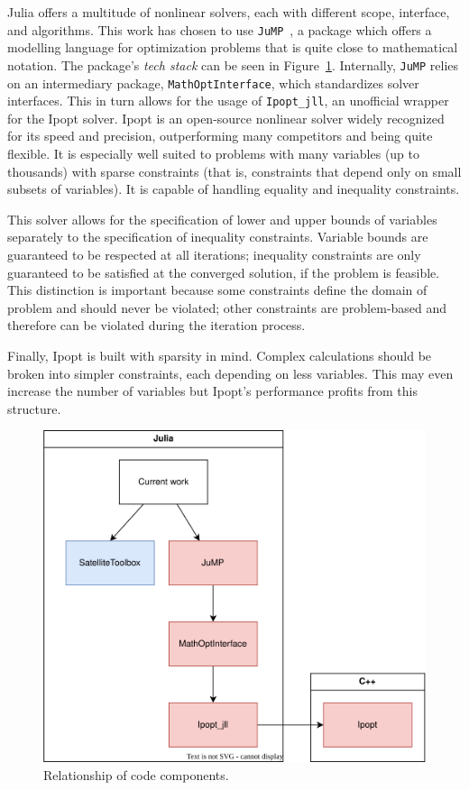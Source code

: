 Julia offers a multitude of nonlinear solvers, each with different scope, interface, and algorithms. This work has chosen to use \texttt{JuMP}~\cite{jump}, a package which offers a modelling language for optimization problems that is quite close to mathematical notation. The package's \textit{tech stack} can be seen in Figure~\ref{fig:tech_stack}. Internally, \texttt{JuMP} relies on an intermediary package, \texttt{MathOptInterface}, which standardizes solver interfaces. This in turn allows for the usage of \texttt{Ipopt\_jll}, an unofficial wrapper for the Ipopt solver. Ipopt is an open-source nonlinear solver widely recognized for its speed and precision, outperforming many competitors and being quite flexible. It is especially well suited to problems with many variables (up to thousands) with sparse constraints (that is, constraints that depend only on small subsets of variables). It is capable of handling equality and inequality constraints.

This solver allows for the specification of lower and upper bounds of variables separately to the specification of inequality constraints. Variable bounds are guaranteed to be respected at all iterations; inequality constraints are only guaranteed to be satisfied at the converged solution, if the problem is feasible. This distinction is important because some constraints define the domain of problem and should never be violated; other constraints are problem-based and therefore can be violated during the iteration process.

Finally, Ipopt is built with sparsity in mind. Complex calculations should be broken into simpler constraints, each depending on less variables. This may even increase the number of variables but Ipopt's performance profits from this structure.

\begin{figure}[htbp]
    \centering
        \includegraphics[width=\textwidth]{img/techstack.png}
    \caption{Relationship of code components.}
    \label{fig:tech_stack}
\end{figure}

